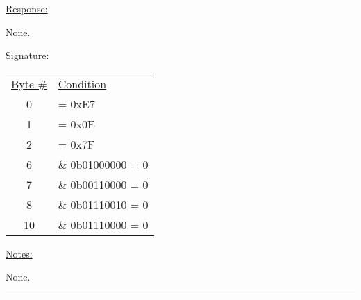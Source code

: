 \underline{Response:} 

None.

\underline{Signature:}

\begin{tabular}{c l}
\underline{Byte \#} & \underline{Condition}\\
0 & = 0xE7\\
1 & = 0x0E\\
2 & = 0x7F\\
6 & \& 0b01000000 = 0\\
7 & \& 0b00110000 = 0\\
8 & \& 0b01110010 = 0\\
10 & \& 0b01110000 = 0\\
\end{tabular}

\underline{Notes:} 

None.

\rule{15.1cm}{0.4pt}
